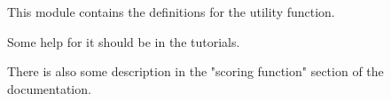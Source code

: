 This module contains the definitions for the utility function.

Some help for it should be in the tutorials.

There is also some description in the "scoring function" section of the documentation.

\vfill\eject








